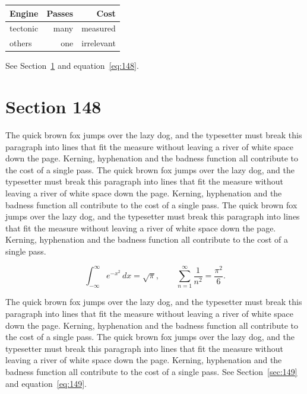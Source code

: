 \documentclass{article}
\begin{document}
\begin{center}
\begin{tabular}{lrr}
\toprule
Engine & Passes & Cost \\
\midrule
tectonic & many & measured \\
others & one & irrelevant \\
\bottomrule
\end{tabular}
\end{center}

See Section~\ref{sec:148} and equation~\eqref{eq:148}.
\section{Section 148}
\label{sec:148}
The quick brown fox jumps over the lazy dog, and the typesetter must break this paragraph into lines that fit the measure without leaving a river of white space down the page. Kerning, hyphenation and the badness function all contribute to the cost of a single pass. The quick brown fox jumps over the lazy dog, and the typesetter must break this paragraph into lines that fit the measure without leaving a river of white space down the page. Kerning, hyphenation and the badness function all contribute to the cost of a single pass. The quick brown fox jumps over the lazy dog, and the typesetter must break this paragraph into lines that fit the measure without leaving a river of white space down the page. Kerning, hyphenation and the badness function all contribute to the cost of a single pass. 

\begin{equation}\label{eq:148}
\int_{-\infty}^{\infty} e^{-x^{2}}\,dx = \sqrt{\pi}, \qquad
\sum_{n=1}^{\infty} \frac{1}{n^{2}} = \frac{\pi^{2}}{6}.
\end{equation}

The quick brown fox jumps over the lazy dog, and the typesetter must break this paragraph into lines that fit the measure without leaving a river of white space down the page. Kerning, hyphenation and the badness function all contribute to the cost of a single pass. The quick brown fox jumps over the lazy dog, and the typesetter must break this paragraph into lines that fit the measure without leaving a river of white space down the page. Kerning, hyphenation and the badness function all contribute to the cost of a single pass. 
See Section~\ref{sec:149} and equation~\eqref{eq:149}.
\end{document}
